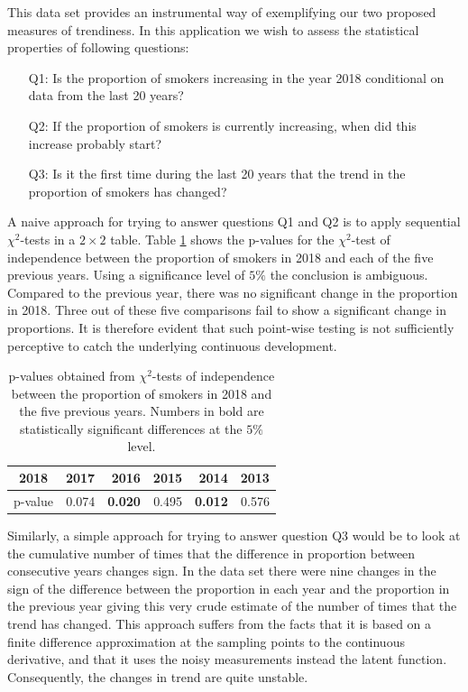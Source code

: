 \documentclass[11pt,]{article}
\theoremstyle{nonumberplain}
\begin{document}
This data set provides an instrumental way of exemplifying our two
proposed measures of trendiness. In this application we wish to assess
the statistical properties of following questions:

\begin{itemize}
\item[Q1:]{Is the proportion of smokers increasing in the year 2018 conditional on data from the last 20 years?}
\item[Q2:]{If the proportion of smokers is currently increasing, when did this increase probably start?}
\item[Q3:]{Is it the first time during the last 20 years that the trend in the proportion of smokers has changed?}
\end{itemize}

A naive approach for trying to answer questions Q1 and Q2 is to apply
sequential \(\chi^2\)-tests in a \(2\times 2\) table. Table
\ref{tab:chisqtests} shows the p-values for the \(\chi^2\)-test of
independence between the proportion of smokers in 2018 and each of the
five previous years. Using a significance level of \(5\%\) the
conclusion is ambiguous. Compared to the previous year, there was no
significant change in the proportion in 2018. Three out of these five
comparisons fail to show a significant change in proportions. It is
therefore evident that such point-wise testing is not sufficiently
perceptive to catch the underlying continuous development.

\begin{table}[htbp]
\center
\begin{tabular}{c|rrrrr}
2018 & 2017 & 2016 & 2015 & 2014 & 2013\\ \hline
p-value & 0.074 & \textbf{0.020} & 0.495 & \textbf{0.012} & 0.576
\end{tabular}
\caption{p-values obtained from $\chi^2$-tests of independence between the proportion of smokers in 2018 and the five previous years. Numbers in bold are statistically significant differences at the $5\%$ level.}
\label{tab:chisqtests}
\end{table}

Similarly, a simple approach for trying to answer question Q3 would be
to look at the cumulative number of times that the difference in
proportion between consecutive years changes sign. In the data set there
were nine changes in the sign of the difference between the proportion
in each year and the proportion in the previous year giving this very
crude estimate of the number of times that the trend has changed. This
approach suffers from the facts that it is based on a finite difference
approximation at the sampling points to the continuous derivative, and
that it uses the noisy measurements instead the latent function.
Consequently, the changes in trend are quite unstable.
\end{document}
